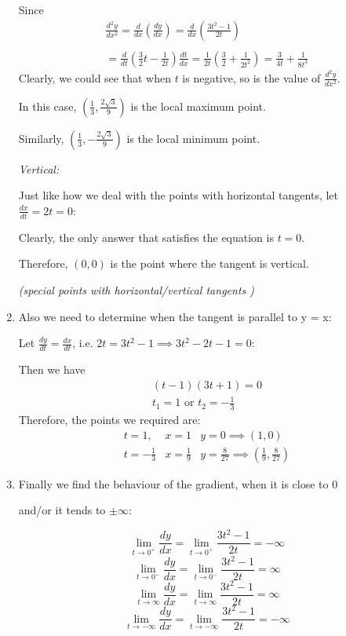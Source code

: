 \documentclass[12pt]{report}
\begin{document}
\begin{enumerate}
    Since 
    $$
    \begin{array}{l}
        \frac{d^2y}{dx^2} = \frac{d}{dx}(\frac{dy}{dx}) = \frac{d}{dx}(\frac{3t^2 - 1}{2t})\\\\
        =\frac{d}{dt}(\frac{3}{2}t - \frac{1}{2t})\frac{dt}{dx}
        = \frac{1}{2t}(\frac{3}{2} + \frac{1}{2t^2}) 
        = \frac{3}{4t} + \frac{1}{8t^3}
    \end{array}
    $$
    Clearly, we could see that when $t$ is negative, so is the value of $\frac{d^2y}{dx^2}$. 
    
    In this case, 
    $(\frac{1}{3}, \frac{2\sqrt{3}}{9})$ is the local maximum point.

    Similarly,
    $(\frac{1}{3}, -\frac{2\sqrt{3}}{9})$ is the local minimum point.

    \emph{Vertical:} 
    
    Just like how we deal with the points with horizontal tangents, 
    let $\frac{dx}{dt} = 2t = 0$:

    Clearly, the only answer that satisfies the equation is $t = 0$.

    Therefore, $(0, 0)$ is the point where the tangent is vertical.

    \emph{(special points with horizontal/vertical tangents \checkmark)}
    \item Also we need to determine when the tangent is parallel to y = x:
    
    Let $\frac{dy}{dt} = \frac{dx}{dt}$, i.e. $2t = 3t^2 - 1 \implies 3t^2 - 2t - 1 = 0$:

    Then we have $$
    \begin{array}{ll}
        (t - 1)(3t + 1) = 0\\
        t_1 = 1 \text{ or } t_2 = -\frac{1}{3}
    \end{array}
    $$Therefore, the points we required are:$$
    \begin{array}{lll}
        t = 1,  & x = 1 & y = 0 \implies (1, 0) \\
        t = -\frac{1}{3} & x = \frac{1}{9} & y = \frac{8}{27} \implies (\frac{1}{9}, \frac{8}{27})
    \end{array}
    $$
    \item Finally we find the behaviour of the gradient, when it is close to $0$ 
    
    and/or it tends to $\pm \infty$:

    $$
    \lim_{t \to 0^+} \frac{dy}{dx} = \lim_{t \to 0^+} \frac{3t^2 - 1}{2t} = - \infty
    $$    $$
    \lim_{t \to 0^-} \frac{dy}{dx} = \lim_{t \to 0^-} \frac{3t^2 - 1}{2t} =  \infty
    $$  $$
    \lim_{t \to \infty} \frac{dy}{dx} = \lim_{t \to \infty} \frac{3t^2 - 1}{2t} = \infty
    $$   $$
    \lim_{t \to -\infty} \frac{dy}{dx} = \lim_{t \to -\infty} \frac{3t^2 - 1}{2t} = - \infty
    $$


\end{enumerate}
\end{document}
